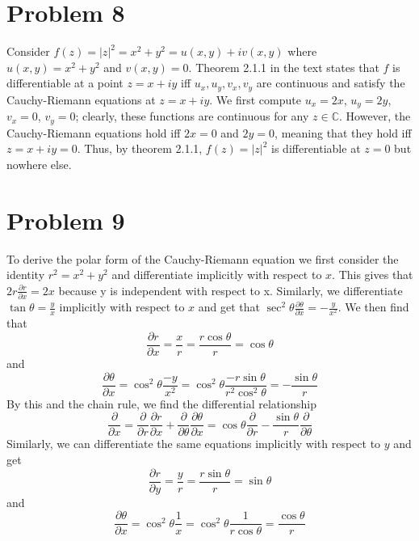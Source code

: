 \documentclass{article}
\begin{document}
\section{Problem 8}
Consider $f(z)=|z|^2=x^2+y^2=u(x,y)+iv(x,y)$ where $u(x,y)=x^2+y^2$ and $v(x,y)=0$. Theorem 2.1.1 in the text states that $f$ is differentiable at a point $z=x+iy$ iff $u_x,u_y,v_x,v_y$ are continuous and satisfy the Cauchy-Riemann equations at $z=x+iy$. We first compute $u_x=2x$, $u_y=2y$, $v_x=0$, $v_y=0$; clearly, these functions are continuous for any $z\in\mathbb{C}$. However, the Cauchy-Riemann equations hold iff $2x=0$ and $2y=0$, meaning that they hold iff $z=x+iy=0$. Thus, by theorem 2.1.1, $f(z)=|z|^2$ is differentiable at $z=0$ but nowhere else.

\section{Problem 9}
To derive the polar form of the Cauchy-Riemann equation we first consider the identity $r^2=x^2+y^2$ and differentiate implicitly with respect to $x$. This gives that $2r\frac{\partial r}{\partial x}=2x$ because y is independent with respect to x. Similarly, we differentiate $\tan\theta=\frac{y}{x}$ implicitly with respect to $x$ and get that $\sec^2\theta\frac{\partial \theta}{\partial x}=-\frac{y}{x^2}$. We then find that
\begin{equation*}
    \frac{\partial r}{\partial x} = \frac{x}{r} = \frac{r\cos\theta}{r} = \cos\theta
\end{equation*}
and
\begin{equation*}
    \frac{\partial\theta}{\partial x} = \cos^2\theta\frac{-y}{x^2} = \cos^2\theta\frac{-r\sin\theta}{r^2\cos^2\theta}=-\frac{\sin\theta}{r}
\end{equation*}
By this and the chain rule, we find the differential relationship
\begin{equation*}
    \frac{\partial}{\partial x} = \frac{\partial}{\partial r}\frac{\partial r}{\partial x}+\frac{\partial}{\partial \theta}\frac{\partial \theta}{\partial x} = \cos\theta\frac{\partial}{\partial r}-\frac{\sin\theta}{r}\frac{\partial}{\partial \theta}
\end{equation*}
Similarly, we can differentiate the same equations implicitly with respect to $y$ and get 
\begin{equation*}
    \frac{\partial r}{\partial y} = \frac{y}{r} = \frac{r\sin\theta}{r} = \sin\theta
\end{equation*}
and
\begin{equation*}
    \frac{\partial\theta}{\partial x} = \cos^2\theta\frac{1}{x} = \cos^2\theta\frac{1}{r\cos\theta}=\frac{\cos\theta}{r}
\end{equation*}
\end{document}
